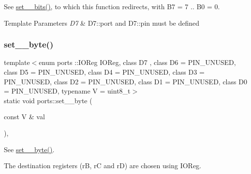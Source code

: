 See \hyperlink{namespaceports_aac15fb87d8fede3f2bf8d764ab42965f}{set\+\_\+\_\+bits()}, to which this function redirects, with {\ttfamily B7 = 7} .. {\ttfamily B0 = 0}. 


\begin{DoxyTemplParams}{Template Parameters}
{\em D7} & {\ttfamily D7\+::port} and {\ttfamily D7\+::pin} must be defined \\
\hline
\end{DoxyTemplParams}
\hypertarget{namespaceports_a61265646961334c58df6d4ed66e290d0}{}\label{namespaceports_a61265646961334c58df6d4ed66e290d0} 
\subsubsection{\texorpdfstring{set\+\_\+\_\+byte()}{set\_8\_byte()}\hspace{0.1cm}{\footnotesize\ttfamily [2/2]}}
{\footnotesize\ttfamily template$<$enum ports \+::\+I\+O\+Reg I\+O\+Reg, class D7 , class D6  = P\+I\+N\+\_\+\+U\+N\+U\+S\+ED, class D5  = P\+I\+N\+\_\+\+U\+N\+U\+S\+ED, class D4  = P\+I\+N\+\_\+\+U\+N\+U\+S\+ED, class D3  = P\+I\+N\+\_\+\+U\+N\+U\+S\+ED, class D2  = P\+I\+N\+\_\+\+U\+N\+U\+S\+ED, class D1  = P\+I\+N\+\_\+\+U\+N\+U\+S\+ED, class D0  = P\+I\+N\+\_\+\+U\+N\+U\+S\+ED, typename V  = uint8\+\_\+t$>$ \\
static void ports\+::set\+\_\+\_\+byte (\begin{DoxyParamCaption}\item[{const V \&}]{val }\end{DoxyParamCaption})\hspace{0.3cm}{\ttfamily [inline]}, {\ttfamily [static]}}



See \hyperlink{namespaceports_a7034c689dd509dc9c11ba8be46a26fd0}{set\+\_\+\_\+byte()}. 

The destination registers ({\ttfamily rB}, {\ttfamily rC} and {\ttfamily rD}) are chosen using I\+O\+Reg. 